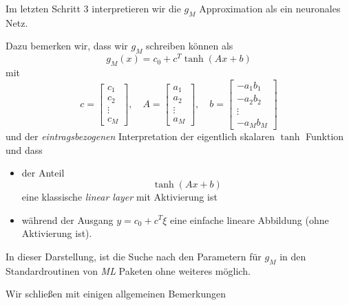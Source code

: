 \documentclass[
]{book}
\providecommand{\tightlist}{%
  \setlength{\itemsep}{0pt}\setlength{\parskip}{0pt}}
\theoremstyle{definition}
\theoremstyle{definition}
\theoremstyle{definition}
\theoremstyle{definition}
\theoremstyle{remark}
\begin{document}
Im letzten Schritt 3 interpretieren wir die \(g_M\) Approximation als ein neuronales
Netz.

Dazu bemerken wir, dass wir \(g_M\) schreiben können als
\begin{equation}\label{eq:eqn-gm-approx}
g_M(x) = c_0 + c^T \tanh(Ax+b)
\end{equation}
mit
\begin{equation*}
c=
\begin{bmatrix}
c_1 \\ c_2 \\ \vdots \\ c_M
\end{bmatrix}, 
\quad
A=
\begin{bmatrix}
a_1 \\ a_2 \\ \vdots \\ a_M
\end{bmatrix}, 
\quad
b=
\begin{bmatrix}
-a_1b_1 \\ -a_2b_2 \\ \vdots \\ -a_Mb_M
\end{bmatrix}
\end{equation*}
und der \emph{eintragsbezogenen} Interpretation der eigentlich skalaren \(\tanh\)
Funktion und dass

\begin{itemize}
\tightlist
\item
  der Anteil
  \begin{equation*}
  \tanh (Ax+b)
  \end{equation*}
  eine klassische \emph{linear layer} mit Aktivierung ist
\item
  während der Ausgang \(y=c_0+c^T\xi\) eine einfache lineare Abbildung (ohne
  Aktivierung ist).
\end{itemize}

In dieser Darstellung, ist die Suche nach den Parametern für \(g_M\) in den
Standardroutinen von \emph{ML} Paketen ohne weiteres möglich.

Wir schließen mit einigen allgemeinen Bemerkungen
\end{document}
